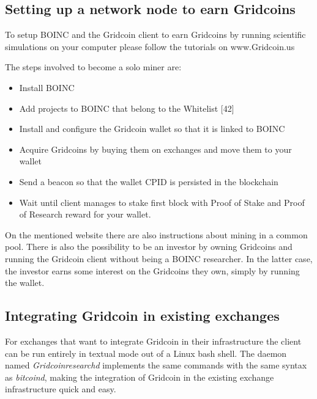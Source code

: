 \subsection{Setting up a network node to earn Gridcoins}

To setup BOINC and the Gridcoin client to earn Gridcoins by running scientific simulations on your computer please follow the tutorials on www.Gridcoin.us

The steps involved to become a solo miner are:
\begin{itemize}
  \item Install BOINC
  \item Add projects to BOINC that belong to the Whitelist [42]
  \item Install and configure the Gridcoin wallet so that it is linked to BOINC 
  \item Acquire Gridcoins by buying them on exchanges and move them to your wallet
  \item Send a beacon so that the wallet CPID is persisted in the blockchain
  \item Wait until client manages to stake first block with Proof of Stake and Proof of Research reward for your wallet.
\end{itemize}

On the mentioned website there are also instructions about mining in a common pool. There is also the possibility to be an investor by owning Gridcoins and running the Gridcoin client without being a BOINC researcher. In the latter case, the investor earns some interest on the Gridcoins they own, simply by running the wallet.\\

\subsection{Integrating Gridcoin in existing exchanges}

For exchanges that want to integrate Gridcoin in their infrastructure the client can be run entirely in textual mode out of a Linux bash shell. The daemon named \textit{Gridcoinresearchd} implements the same commands with the same syntax as \textit{bitcoind}, making the integration of Gridcoin in the existing exchange infrastructure quick and easy.\\
